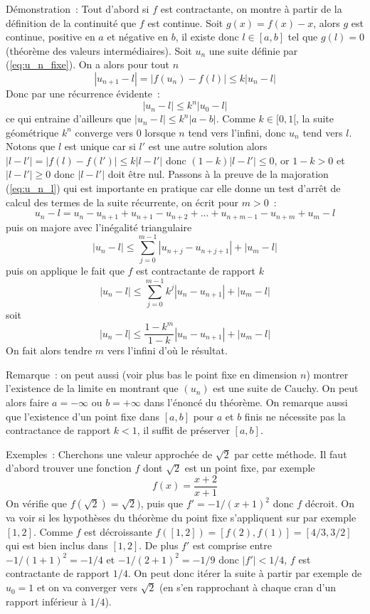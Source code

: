 \documentclass[a4paper,11pt]{article}
\begin{document}
Démonstration~: Tout d'abord si $f$ est contractante, on montre à partir
de la définition de la continuité que $f$ est continue. 
Soit $g(x)=f(x)-x$, alors $g$ est continue, positive en $a$ et négative
en $b$, il existe donc $l\in[a,b]$ tel que $g(l)=0$ (théorème des
valeurs intermédiaires). 
Soit $u_n$ une suite définie par
(\ref{eq:u_n_fixe}). On a alors pour tout $n$
\[ |u_{n+1}-l|=|f(u_n)-f(l)| \leq k |u_n-l| \]
Donc par une récurrence évidente~:
\[ |u_n-l| \leq k^n |u_0-l| \]
ce qui entraine d'ailleurs que $|u_n-l| \leq k^n |a-b|$.
Comme $k \in [0,1[ $, la suite géométrique $k^n$ converge vers 0
lorsque $n$ tend vers l'infini, donc $u_n$ tend vers $l$.
Notons que $l$ est unique car si $l'$ est une autre solution
alors $|l-l'|=|f(l)-f(l')| \leq k|l-l'|$ donc $(1-k)|l-l'| \leq 0$,
or $1-k>0$ et $|l-l'| \geq 0$ donc $|l-l'|$ doit \^etre nul.
Passons à la preuve de la majoration (\ref{eq:u_n_l}) qui est importante
en pratique car elle donne un test d'arrêt de calcul des
termes de la suite récurrente, on écrit pour $m>0$~:
\[ u_n-l= u_n - u_{n+1} + u_{n+1} - u_{n+2} + ... + u_{n+m-1}- u_{n+m}
+ u_m-l \]
puis on majore avec l'inégalité triangulaire
\[ |u_n-l| \leq \sum_{j=0}^{m-1} |u_{n+j}-u_{n+j+1}| + |u_m-l| \]
puis on applique le fait que $f$ est contractante de rapport $k$
\[ |u_n-l| \leq \sum_{j=0}^{m-1} k^j |u_{n}-u_{n+1}| + |u_m-l| \]
soit
\[ |u_n-l| \leq \frac{1-k^m}{1-k} |u_{n}-u_{n+1}| + |u_m-l| \]
On fait alors tendre $m$ vers l'infini d'où le résultat.

Remarque~: on peut aussi (voir plus bas le point fixe en dimension
$n$) montrer l'existence de la limite en montrant que $(u_n)$ est
une suite de Cauchy. On peut alors faire $a=-\infty$ ou $b=+\infty$
dans l'\'enonc\'e du th\'eor\`eme. On remarque aussi 
que l'existence d'un point fixe
dans $[a,b]$ pour $a$ et $b$ finis ne n\'ecessite pas la contractance
de rapport $k<1$, il suffit de pr\'eserver $[a,b]$.

Exemples~: 
Cherchons une valeur approchée de $\sqrt{2}$ par cette méthode.
Il faut d'abord trouver une fonction $f$ dont $\sqrt{2}$ est un point
fixe, par exemple
\[ f(x)=\frac{x+2}{x+1}\]
On vérifie que $f(\sqrt{2})=\sqrt{2})$, puis que $f'=-1/(x+1)^2$
donc $f$ décroit. On va voir si les hypothèses du théorème du point
fixe s'appliquent sur par exemple $[1,2]$. Comme $f$ est décroissante
$f([1,2])=[f(2),f(1)]=[4/3,3/2]$ qui est bien inclus dans $[1,2] $.
De plus $f'$ est comprise entre $-1/(1+1)^2=-1/4$ et $-1/(2+1)^2=-1/9$ donc
$|f'|<1/4$, $f$ est contractante de rapport $1/4$. On peut donc
itérer la suite à partir par exemple de $u_0=1$ et on va converger
vers $\sqrt{2}$ (en s'en rapprochant à chaque cran d'un rapport
inférieur à $1/4$).
\end{document}

